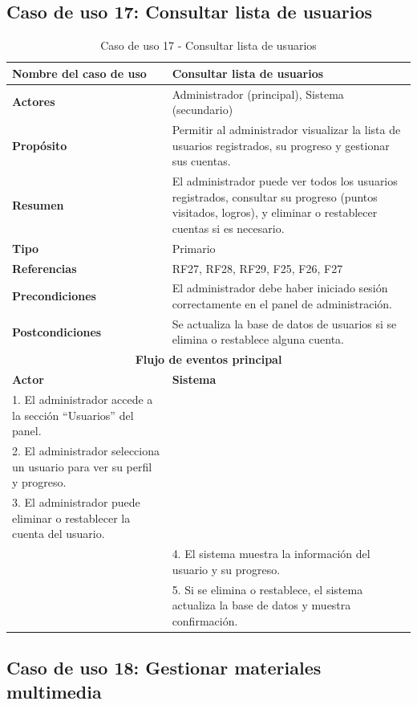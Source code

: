 \subsection{Caso de uso 17: Consultar lista de usuarios}

\begin{table}[H]
\centering
\caption{Caso de uso 17 - Consultar lista de usuarios}
\begin{tabular}{|p{4.5cm}|p{10.5cm}|}
\hline
\textbf{Nombre del caso de uso} & Consultar lista de usuarios \\
\hline
\textbf{Actores} & Administrador (principal), Sistema (secundario) \\
\hline
\textbf{Propósito} & Permitir al administrador visualizar la lista de usuarios registrados, su progreso y gestionar sus cuentas. \\
\hline
\textbf{Resumen} & El administrador puede ver todos los usuarios registrados, consultar su progreso (puntos visitados, logros), y eliminar o restablecer cuentas si es necesario. \\
\hline
\textbf{Tipo} & Primario \\
\hline
\textbf{Referencias} & RF27, RF28, RF29, F25, F26, F27 \\
\hline
\textbf{Precondiciones} & El administrador debe haber iniciado sesión correctamente en el panel de administración. \\
\hline
\textbf{Postcondiciones} & Se actualiza la base de datos de usuarios si se elimina o restablece alguna cuenta. \\
\hline
\multicolumn{2}{|c|}{\textbf{Flujo de eventos principal}} \\
\hline
\textbf{Actor} & \textbf{Sistema} \\
\hline
1. El administrador accede a la sección “Usuarios” del panel. & \\
\hline
2. El administrador selecciona un usuario para ver su perfil y progreso. & \\
\hline
3. El administrador puede eliminar o restablecer la cuenta del usuario. & \\
\hline
& 4. El sistema muestra la información del usuario y su progreso. \\
\hline
& 5. Si se elimina o restablece, el sistema actualiza la base de datos y muestra confirmación. \\
\hline
\end{tabular}
\end{table}

\subsection{Caso de uso 18: Gestionar materiales multimedia}

